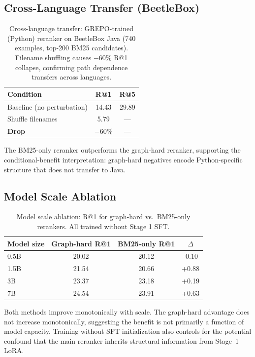 \documentclass{article}
\begin{document}
\subsection{Cross-Language Transfer (BeetleBox)}
\label{app:beetlebox}

\begin{table}[h]
\centering
\caption{Cross-language transfer: GREPO-trained (Python) reranker on BeetleBox Java (740 examples, top-200 BM25 candidates). Filename shuffling causes $-$60\% R@1 collapse, confirming path dependence transfers across languages.}
\label{tab:beetlebox}
\small
\begin{tabular}{lcc}
\toprule
\textbf{Condition} & \textbf{R@1} & \textbf{R@5} \\
\midrule
Baseline (no perturbation) & 14.43 & 29.89 \\
Shuffle filenames          & 5.79 & --- \\
\midrule
\textbf{Drop} & $-$60\% & --- \\
\bottomrule
\end{tabular}
\end{table}

The BM25-only reranker outperforms the graph-hard reranker, supporting the conditional-benefit interpretation: graph-hard negatives encode Python-specific structure that does not transfer to Java.


\subsection{Model Scale Ablation}
\label{app:scale}

\begin{table}[h]
\centering
\caption{Model scale ablation: R@1 for graph-hard vs.\ BM25-only rerankers. All trained without Stage 1 SFT.}
\label{tab:scale}
\small
\begin{tabular}{lccc}
\toprule
\textbf{Model size} & \textbf{Graph-hard R@1} & \textbf{BM25-only R@1} & \textbf{$\Delta$} \\
\midrule
0.5B  & 20.02 & 20.12 & -0.10 \\
1.5B  & 21.54 & 20.66 & +0.88 \\
3B    & 23.37 & 23.18 & +0.19 \\
7B    & 24.54 & 23.91 & +0.63 \\
\bottomrule
\end{tabular}
\end{table}

Both methods improve monotonically with scale. The graph-hard advantage does not increase monotonically, suggesting the benefit is not primarily a function of model capacity. Training without SFT initialization also controls for the potential confound that the main reranker inherits structural information from Stage~1 LoRA.
\end{document}
